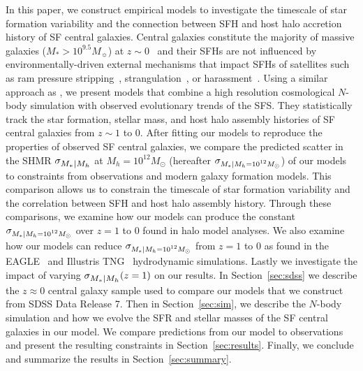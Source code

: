 \documentclass[12pt, letterpaper, preprint, tighten]{aastex62}
\newcommand{\siglogm}{\sigma_{\scaleto{M_*|M_h}{8pt}}}
\newcommand{\sigtwe}{\sigma_{\scaleto{M_*|M_h=10^{12}M_\odot}{8pt}}}
\begin{document}
In this paper, we construct empirical models to investigate the timescale
of star formation variability and the connection between SFH and host halo
accretion history of SF central galaxies. Central galaxies constitute the 
majority of massive galaxies ($M_*>10^{9.5}M_\sun$) at $z\sim0$~\citep{wetzel2013} 
and their SFHs are not influenced by environmentally-driven external 
mechanisms that impact SFHs of satellites such as ram pressure 
stripping~\citep{gunn1972,bekki2009}, strangulation~\citep{larson1980, peng2015}, 
or harassment~\citep{moore1998}. Using a similar approach as \cite{wetzel2013, hahn2017b}, 
we present models that combine a high resolution cosmological $N$-body 
simulation with observed evolutionary trends of the SFS. They statistically 
track the star formation, stellar mass, and host halo assembly histories of 
SF central galaxies from $z\sim1$ to $0$. After fitting our models to reproduce 
the properties of observed SF central galaxies, we compare the predicted 
scatter in the SHMR $\siglogm$ at $M_h=10^{12}M_\odot$ (hereafter $\sigtwe$) 
of our models to constraints from observations and modern galaxy formation 
models. This comparison allows us to constrain the timescale of star formation 
variability and the correlation between SFH and host halo assembly history. 
Through these comparisons, we examine how our models can produce the constant 
$\sigtwe$ over $z=1$ to 0 found in halo model analyses. We also examine how 
our models can reduce $\sigtwe$ from $z=1$ to 0 as found in the EAGLE~\citep{matthee2017} 
and Illustris TNG~\citep{pillepich2018} hydrodynamic simulations. Lastly 
we investigate the impact of varying $\siglogm(z=1)$ on our results. In 
Section~\ref{sec:sdss} we describe the $z\approx0$ central galaxy sample used to compare our models that we 
construct from SDSS Data Release 7. Then in Section~\ref{sec:sim}, we 
describe the $N$-body simulation and how we evolve the SFR and stellar 
masses of the SF central galaxies in our model. We compare predictions 
from our model to observations and present the resulting constraints in 
Section~\ref{sec:results}. Finally, we conclude and summarize the results 
in Section~\ref{sec:summary}.
\end{document}
